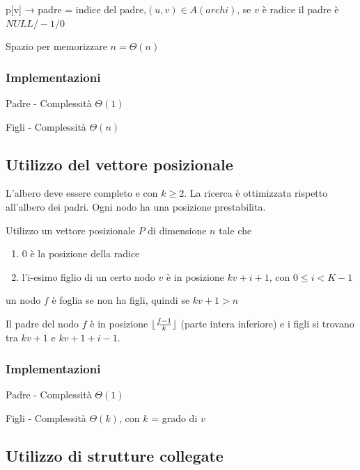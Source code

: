 \documentclass[tikz]{article}
\DeclarePairedDelimiter\floor{\lfloor}{\rfloor}
\providecommand{\tightlist}{%
  \setlength{\itemsep}{0pt}\setlength{\parskip}{0pt}}
\begin{document}
{{{p{[}v{]} → padre = indice del padre,$(u,v) \in A(archi)$, se $v$ è radice il padre è $NULL/-1/0$}

{Spazio per memorizzare $n=\Theta(n)$}

\subsubsection{Implementazioni}

{Padre - Complessità $\Theta(1)$}



{Figli - Complessità $\Theta(n)$}



\subsection{Utilizzo del vettore posizionale}

{L'albero deve essere completo e con $k \geq 2$. La ricerca è ottimizzata rispetto all'albero dei padri. Ogni nodo ha una posizione prestabilita.}

{Utilizzo un vettore posizionale $P$ di dimensione $n$ tale che }

\begin{enumerate}
\tightlist
\item
  {0 è la posizione della radice}
\item
  {l'i-esimo figlio di un certo nodo $v$ è in posizione $kv+i+1$, con $0\leq i < K-1$}
\end{enumerate}

{un nodo $f$ è foglia se non ha figli, quindi se $kv+1>n$}

{Il padre del nodo $f$ è in posizione $\floor{\frac{f-1}{k}}$ (parte intera inferiore) e i figli si trovano tra $kv+1$ e $kv+1+i-1$.

\subsubsection{Implementazioni}

{Padre - Complessità $\Theta(1)$}



{Figli - Complessità $\Theta(k)$, con $k$ = grado di $v$}



\subsection{Utilizzo di strutture collegate}

}}}
\end{document}
